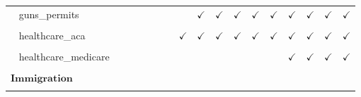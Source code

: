 \documentclass[
  12pt]{article}
\begin{document}
\begin{table}[H]
{\begin{tabular}{lcccccccccccccccc}
$\hspace{10pt}$guns\_permits &  &  &  &  &  &  &  & $\checkmark$ & $\checkmark$ & $\checkmark$ & $\checkmark$ & $\checkmark$ & $\checkmark$ & $\checkmark$ & $\checkmark$ & $\checkmark$\\
\cellcolor{gray!6}{$\textbf{Health Care}$} & \cellcolor{gray!6}{} & \cellcolor{gray!6}{} & \cellcolor{gray!6}{} & \cellcolor{gray!6}{} & \cellcolor{gray!6}{} & \cellcolor{gray!6}{} & \cellcolor{gray!6}{} & \cellcolor{gray!6}{} & \cellcolor{gray!6}{} & \cellcolor{gray!6}{} & \cellcolor{gray!6}{} & \cellcolor{gray!6}{} & \cellcolor{gray!6}{} & \cellcolor{gray!6}{} & \cellcolor{gray!6}{} & \cellcolor{gray!6}{}\\
$\hspace{10pt}$healthcare\_aca &  &  &  &  &  &  & $\checkmark$ & $\checkmark$ & $\checkmark$ & $\checkmark$ & $\checkmark$ & $\checkmark$ & $\checkmark$ & $\checkmark$ & $\checkmark$ & $\checkmark$\\
\cellcolor{gray!6}{$\hspace{10pt}$healthcare\_acamandate} & \cellcolor{gray!6}{} & \cellcolor{gray!6}{} & \cellcolor{gray!6}{} & \cellcolor{gray!6}{} & \cellcolor{gray!6}{} & \cellcolor{gray!6}{} & \cellcolor{gray!6}{} & \cellcolor{gray!6}{} & \cellcolor{gray!6}{} & \cellcolor{gray!6}{} & \cellcolor{gray!6}{} & \cellcolor{gray!6}{} & \cellcolor{gray!6}{} & \cellcolor{gray!6}{$\checkmark$} & \cellcolor{gray!6}{$\checkmark$} & \cellcolor{gray!6}{$\checkmark$}\\
$\hspace{10pt}$healthcare\_medicare &  &  &  &  &  &  &  &  &  &  &  &  & $\checkmark$ & $\checkmark$ & $\checkmark$ & $\checkmark$\\
\cellcolor{gray!6}{$\hspace{10pt}$healthcare\_medicareage} & \cellcolor{gray!6}{} & \cellcolor{gray!6}{} & \cellcolor{gray!6}{} & \cellcolor{gray!6}{} & \cellcolor{gray!6}{} & \cellcolor{gray!6}{} & \cellcolor{gray!6}{} & \cellcolor{gray!6}{} & \cellcolor{gray!6}{} & \cellcolor{gray!6}{} & \cellcolor{gray!6}{} & \cellcolor{gray!6}{} & \cellcolor{gray!6}{} & \cellcolor{gray!6}{$\checkmark$} & \cellcolor{gray!6}{$\checkmark$} & \cellcolor{gray!6}{}\\
$\textbf{Immigration}$ &  &  &  &  &  &  &  &  &  &  &  &  &  &  &  & \\
\cellcolor{gray!6}{$\hspace{10pt}$immig\_legalize} & \cellcolor{gray!6}{} & \cellcolor{gray!6}{$\checkmark$} & \cellcolor{gray!6}{} & \cellcolor{gray!6}{} & \cellcolor{gray!6}{$\checkmark$} & \cellcolor{gray!6}{$\checkmark$} & \cellcolor{gray!6}{$\checkmark$} & \cellcolor{gray!6}{$\checkmark$} & \cellcolor{gray!6}{$\checkmark$} & \cellcolor{gray!6}{$\checkmark$} & \cellcolor{gray!6}{$\checkmark$} & \cellcolor{gray!6}{$\checkmark$} & \cellcolor{gray!6}{} & \cellcolor{gray!6}{$\checkmark$} & \cellcolor{gray!6}{$\checkmark$} & \cellcolor{gray!6}{$\checkmark$}\\

\end{tabular}}
\end{table}
\end{document}
